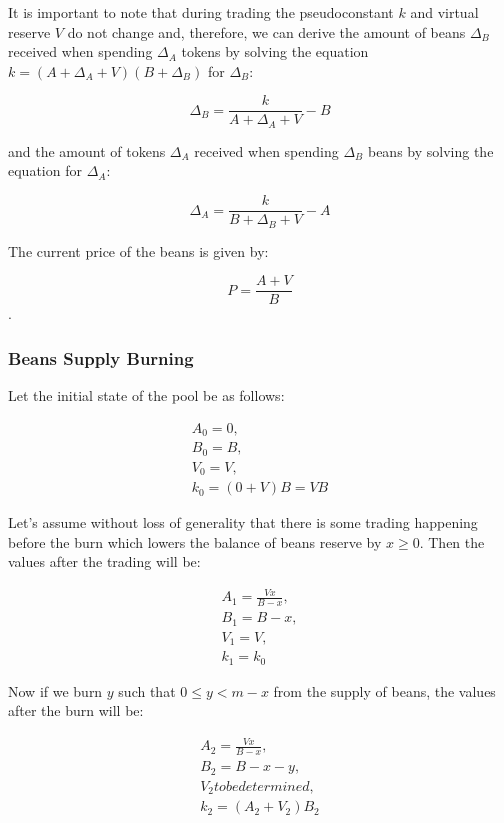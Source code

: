 \documentclass[11pt,a4paper]{article}
\theoremstyle{definition}
\begin{document}
It is important to note that during trading the pseudoconstant $k$ and virtual reserve $V$ do not change and, therefore, we can derive the amount of beans $\Delta_B$ received when spending $\Delta_A$ tokens by solving the equation $k = (A+\Delta_A+V)(B+\Delta_B)$ for $\Delta_B$:

\begin{equation}
    \Delta_B = \frac{k}{A+\Delta_A+V} - B
\end{equation}

and the amount of tokens $\Delta_A$ received when spending $\Delta_B$ beans by solving the equation for $\Delta_A$:

\begin{equation}
    \Delta_A = \frac{k}{B+\Delta_B+V} - A
\end{equation}

The current price of the beans is given by:

\begin{equation}
    P = \frac{A+V}{B}
\end{equation}.

\subsubsection{Beans Supply Burning}

Let the initial state of the pool be as follows:

\begin{align*}
    A_0 = 0, \\
    B_0 = B, \\
    V_0 = V, \\
    k_0 = (0+V)B = VB
\end{align*}

Let's assume without loss of generality that there is some trading happening before the burn which lowers the balance of beans reserve by $x \geq 0$. Then the values after the trading will be:

\begin{align*}
    A_1 = \frac{Vx}{B-x}, \\
    B_1 = B - x, \\
    V_1 = V, \\
    k_1 = k_0
\end{align*}

Now if we burn $y$ such that $0 \leq y < m - x$ from the supply of beans, the values after the burn will be:

\begin{align*}
    A_2 = \frac{Vx}{B-x}, \\
    B_2 = B - x - y, \\    
    V_2 to be determined, \\
    k_2 = (A_2+V_2)B_2
\end{align*}
\end{document}
